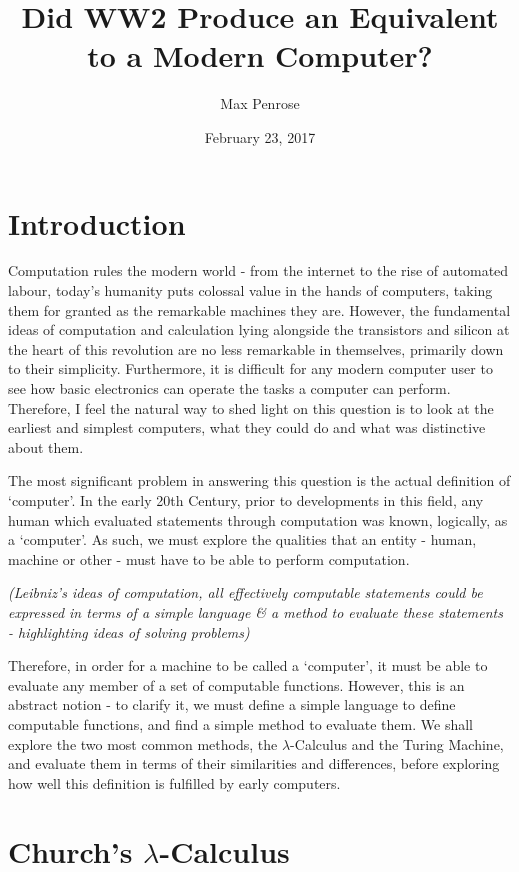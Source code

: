 \documentclass {article}
\title{Did WW2 Produce an Equivalent to a Modern Computer?}
\date{February 23, 2017}
\author{Max Penrose}
\begin{document}
\maketitle
\tableofcontents
\clearpage

\section*{Introduction}
Computation rules the modern world - from the internet to the rise of automated labour, today's humanity puts colossal value in the hands of computers, taking them for granted as the remarkable machines they are. However, the fundamental ideas of computation and calculation lying alongside the transistors and silicon at the heart of this revolution are no less remarkable in themselves, primarily down to their simplicity. Furthermore, it is difficult for any modern computer user to see how basic electronics can operate the tasks a computer can perform. Therefore, I feel the natural way to shed light on this question is to look at the earliest and simplest computers, what they could do and what was distinctive about them.

The most significant problem in answering this question is the actual definition of `computer'. In the early 20th Century, prior to developments in this field, any human which evaluated statements through computation was known, logically, as a `computer'. As such, we must explore the qualities that an entity - human, machine or other - must have to be able to perform computation.

\textit{(Leibniz's ideas of computation, all effectively computable statements could be expressed in terms of a simple language \& a method to evaluate these statements - highlighting ideas of solving problems)}

Therefore, in order for a machine to be called a `computer', it must be able to evaluate any member of a set of computable functions. However, this is an abstract notion - to clarify it, we must define a simple language to define computable functions, and find a simple method to evaluate them. We shall explore the two most common methods, the $\lambda$-Calculus and the Turing Machine, and evaluate them in terms of their similarities and differences, before exploring how well this definition is fulfilled by early computers.



\section{Church's $\lambda$-Calculus}
\end{document}
